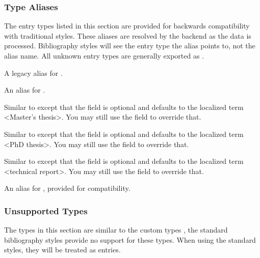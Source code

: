 \documentclass{ltxdockit}[2011/03/25]
\begin{document}
\subsubsection{Type Aliases}
\label{bib:typ:als}

The entry types listed in this section are provided for backwards compatibility with traditional \bibtex styles. These aliases are resolved by the backend as the data is processed. Bibliography styles will see the entry type the alias points to, not the alias name. All unknown entry types are generally exported as .

\begin{typelist}

 A \bibtex legacy alias for .

 An alias for .

 Similar to  except that the  field is optional and defaults to the localized term <Master's thesis>. You may still use the  field to override that.

 Similar to  except that the  field is optional and defaults to the localized term <PhD thesis>. You may still use the  field to override that.

 Similar to  except that the  field is optional and defaults to the localized term <technical report>. You may still use the  field to override that.


An alias for , provided for  compatibility.

\end{typelist}

\subsubsection{Unsupported Types}
\label{bib:typ:ctm}

The types in this section are similar to the custom types , \ie the standard bibliography styles provide no support for these types. When using the standard styles, they will be treated as  entries.
\end{document}
